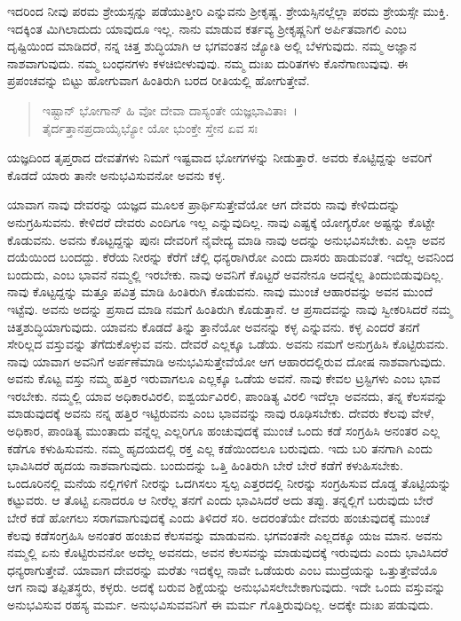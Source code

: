 ಇದರಿಂದ ನೀವು ಪರಮ ಶ್ರೇಯಸ್ಸನ್ನು ಪಡೆಯುತ್ತೀರಿ ಎನ್ನುವನು ಶ‍್ರೀಕೃಷ್ಣ. ಶ್ರೇಯಸ್ಸಿನಲ್ಲೆಲ್ಲಾ ಪರಮ ಶ್ರೇಯಸ್ಸೇ ಮುಕ್ತಿ. ಇದಕ್ಕಿಂತ ಮಿಗಿಲಾದುದು ಯಾವುದೂ ಇಲ್ಲ. ನಾನು ಮಾಡುವ ಕರ್ತವ್ಯ ಶ‍್ರೀಕೃಷ್ಣನಿಗೆ ಅರ್ಪಿತವಾಗಲಿ ಎಂಬ ದೃಷ್ಟಿಯಿಂದ ಮಾಡಿದರೆ, ನನ್ನ ಚಿತ್ತ ಶುದ್ಧಿಯಾಗಿ ಆ ಭಗವಂತನ ಜ್ಯೋತಿ ಅಲ್ಲಿ ಬೆಳಗುವುದು. ನಮ್ಮ ಅಜ್ಞಾನ ನಾಶವಾಗುವುದು. ನಮ್ಮ ಬಂಧನಗಳು ಕಳಚಿಬೀಳುವುವು. ನಮ್ಮ ದುಃಖ ದುರಿತಗಳು ಕೊನೆಗಾಣುವುವು. ಈ ಪ್ರಪಂಚವನ್ನು ಬಿಟ್ಟು ಹೋಗುವಾಗ ಹಿಂತಿರುಗಿ ಬರದ ರೀತಿಯಲ್ಲಿ ಹೋಗುತ್ತೇವೆ.

\begin{verse}
ಇಷ್ಟಾನ್ ಭೋಗಾನ್ ಹಿ ವೋ ದೇವಾ ದಾಸ್ಯಂತೇ ಯಜ್ಞಭಾವಿತಾಃ~।\\ತೈರ್ದತ್ತಾನಪ್ರದಾಯೈಭ್ಯೋ ಯೋ ಭುಂಕ್ತೇ ಸ್ತೇನ ಏವ ಸಃ 
\end{verse}

{\small ಯಜ್ಞದಿಂದ ತೃಪ್ತರಾದ ದೇವತೆಗಳು ನಿಮಗೆ ಇಷ್ಟವಾದ ಭೋಗಗಳನ್ನು ನೀಡುತ್ತಾರೆ. ಅವರು ಕೊಟ್ಟಿದ್ದನ್ನು ಅವರಿಗೆ ಕೊಡದೆ ಯಾರು ತಾನೇ ಅನುಭವಿಸುವನೋ ಅವನು ಕಳ್ಳ.}

ಯಾವಾಗ ನಾವು ದೇವರನ್ನು ಯಜ್ಞದ ಮೂಲಕ ಪ್ರಾರ್ಥಿಸುತ್ತೇವೆಯೋ ಆಗ ದೇವರು ನಾವು ಕೇಳಿದುದನ್ನು ಅನುಗ್ರಹಿಸುವನು. ಕೇಳಿದರೆ ದೇವರು ಎಂದಿಗೂ ಇಲ್ಲ ಎನ್ನುವುದಿಲ್ಲ. ನಾವು ಎಷ್ಟಕ್ಕೆ ಯೋಗ್ಯರೋ ಅಷ್ಟನ್ನು ಕೊಟ್ಟೇ ಕೊಡುವನು. ಅವನು ಕೊಟ್ಟದ್ದನ್ನು ಪುನಃ ದೇವರಿಗೆ ನೈವೇದ್ಯ ಮಾಡಿ ನಾವು ಅದನ್ನು ಅನುಭವಿಸಬೇಕು. ಎಲ್ಲಾ ಅವನ ದಯೆಯಿಂದ ಬಂದದ್ದು. ಕೆರೆಯ ನೀರನ್ನು ಕೆರೆಗೆ ಚೆಲ್ಲಿ ಧನ್ಯರಾಗಿರೋ ಎಂದು ದಾಸರು ಹಾಡುವಂತೆ. ಇದೆಲ್ಲ ಅವನಿಂದ ಬಂದುದು, ಎಂಬ ಭಾವನೆ ನಮ್ಮಲ್ಲಿ ಇರಬೇಕು. ನಾವು ಅವನಿಗೆ ಕೊಟ್ಟರೆ ಅವನೇನೂ ಅದನ್ನೆಲ್ಲ ತಿಂದುಬಿಡುವುದಿಲ್ಲ. ನಾವು ಕೊಟ್ಟದ್ದನ್ನು ಮತ್ತೂ ಪವಿತ್ರ ಮಾಡಿ ಹಿಂತಿರುಗಿ ಕೊಡುವನು. ನಾವು ಮುಂಚೆ ಆಹಾರವನ್ನು ಅವನ ಮುಂದೆ ಇಟ್ಟೆವು. ಅವನು ಅದನ್ನು ಪ್ರಸಾದ ಮಾಡಿ ನಮಗೆ ಹಿಂತಿರುಗಿ ಕೊಡುತ್ತಾನೆ. ಆ ಪ್ರಸಾದವನ್ನು ನಾವು ಸ್ವೀಕರಿಸಿದರೆ ನಮ್ಮ ಚಿತ್ತಶುದ್ಧಿಯಾಗುವುದು. ಯಾವನು ಕೊಡದೆ ತಿನ್ನು ತ್ತಾನೆಯೋ ಅವನನ್ನು ಕಳ್ಳ ಎನ್ನುವನು. ಕಳ್ಳ ಎಂದರೆ ತನಗೆ ಸೇರಿಲ್ಲದ ವಸ್ತುವನ್ನು ತೆಗೆದುಕೊಳ್ಳುವ ವನು. ದೇವರೆ ಎಲ್ಲಕ್ಕೂ ಒಡೆಯ. ಅವನು ನಮಗೆ ಅನುಗ್ರಹಿಸಿ ಕೊಟ್ಟಿರುವನು. ನಾವು ಯಾವಾಗ ಅವನಿಗೆ ಅರ್ಪಣೆಮಾಡಿ ಅನುಭವಿಸುತ್ತೇವೆಯೋ ಆಗ ಆಹಾರದಲ್ಲಿರುವ ದೋಷ ನಾಶವಾಗುವುದು. ಅವನು ಕೊಟ್ಟ ವಸ್ತು ನಮ್ಮ ಹತ್ತಿರ ಇರುವಾಗಲೂ ಎಲ್ಲಕ್ಕೂ ಒಡೆಯ ಅವನೆ. ನಾವು ಕೇವಲ ಟ್ರಸ್ಟಿಗಳು ಎಂಬ ಭಾವ ಇರಬೇಕು. ನಮ್ಮಲ್ಲಿ ಯಾವ ಅಧಿಕಾರವಿರಲಿ, ಐಶ್ವರ್ಯವಿರಲಿ, ಪಾಂಡಿತ್ಯ ವಿರಲಿ ಇದೆಲ್ಲಾ ಅವನದು, ತನ್ನ ಕೆಲಸವನ್ನು ಮಾಡುವುದಕ್ಕೆ ಅವನು ನನ್ನ ಹತ್ತಿರ ಇಟ್ಟಿರುವನು ಎಂಬ ಭಾವವನ್ನು ನಾವು ರೂಢಿಸಬೇಕು. ದೇವರು ಕೆಲವು ವೇಳೆ, ಅಧಿಕಾರ, ಪಾಂಡಿತ್ಯ ಮುಂತಾದು ವನ್ನೆಲ್ಲ ಎಲ್ಲರಿಗೂ ಹಂಚುವುದಕ್ಕೆ ಮುಂಚೆ ಒಂದು ಕಡೆ ಸಂಗ್ರಹಿಸಿ ಅನಂತರ ಎಲ್ಲ ಕಡೆಗೂ ಕಳುಹಿಸುವನು. ನಮ್ಮ ಹೃದಯದಲ್ಲಿ ರಕ್ತ ಎಲ್ಲ ಕಡೆಯಿಂದಲೂ ಬರುವುದು. ಇದು ಬರಿ ತನಗಾಗಿ ಎಂದು ಭಾವಿಸಿದರೆ ಹೃದಯ ನಾಶವಾಗುವುದು. ಬಂದುದನ್ನು ಒತ್ತಿ ಹಿಂತಿರುಗಿ ಬೇರೆ ಬೇರೆ ಕಡೆಗೆ ಕಳುಹಿಸಬೇಕು. ಒಂದೂರಿನಲ್ಲಿ ಮನೆಯ ನಲ್ಲಿಗಳಿಗೆ ನೀರನ್ನು ಒದಗಿಸಲು ಸ್ವಲ್ಪ ಎತ್ತರದಲ್ಲಿ ನೀರನ್ನು ಸಂಗ್ರಹಿಸುವ ದೊಡ್ಡ ತೊಟ್ಟಿಯನ್ನು ಕಟ್ಟುವರು. ಆ ತೊಟ್ಟಿ ಏನಾದರೂ ಆ ನೀರೆಲ್ಲ ತನಗೆ ಎಂದು ಭಾವಿಸಿದರೆ ಅದು ತಪ್ಪು. ತನ್ನಲ್ಲಿಗೆ ಬರುವುದು ಬೇರೆ ಬೇರೆ ಕಡೆ ಹೋಗಲು ಸರಾಗವಾಗುವುದಕ್ಕೆ ಎಂದು ತಿಳಿದರೆ ಸರಿ. ಅದರಂತೆಯೇ ದೇವರು ಹಂಚುವುದಕ್ಕೆ ಮುಂಚೆ ಕೆಲವು ಕಡೆಸಂಗ್ರಹಿಸಿ ಅನಂತರ ಹಂಚುವ ಕೆಲಸವನ್ನು ಮಾಡುವನು. ಭಗವಂತನೇ ಎಲ್ಲದಕ್ಕೂ ಯಜ ಮಾನ. ಅವನು ನಮ್ಮಲ್ಲಿ ಏನು ಕೊಟ್ಟಿರುವನೋ ಅದೆಲ್ಲ ಅವನದು, ಅವನ ಕೆಲಸವನ್ನು ಮಾಡುವುದಕ್ಕೆ ಇರುವುದು ಎಂದು ಭಾವಿಸಿದರೆ ಧನ್ಯರಾಗುತ್ತೇವೆ. ಯಾವಾಗ ದೇವರನ್ನು ಮರೆತು ಇದಕ್ಕೆಲ್ಲ ನಾವೇ ಒಡೆಯರು ಎಂಬ ಮುದ್ರೆಯನ್ನು ಒತ್ತುತ್ತೇವೆಯೊ ಆಗ ನಾವು ತಪ್ಪಿತಸ್ಥರು, ಕಳ್ಳರು. ಅದಕ್ಕೆ ಬರುವ ಶಿಕ್ಷೆಯನ್ನು ಅನುಭವಿಸಲೇಬೇಕಾಗುವುದು. ಇದೇ ಒಂದು ವಸ್ತುವನ್ನು ಅನುಭವಿಸುವ ರಹಸ್ಯ ಮರ್ಮ. ಅನುಭವಿಸುವವನಿಗೆ ಈ ಮರ್ಮ ಗೊತ್ತಿರುವುದಿಲ್ಲ. ಅದಕ್ಕೇ ದುಃಖ ಪಡುವುದು.

